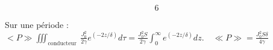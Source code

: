 \begin{quest}
{            $$
            6
            $$
            
            
            Sur une période : $<P \gg \iiint_{\text {conducteur }} \frac{J_0^2}{2 \gamma} e^{(-2 z / \delta)} d \tau=\frac{J_0^2 S}{2 \gamma} \int_0^{\infty} e^{(-2 z / \delta)} d z . \quad \ll P \gg=\frac{J_0^2 S \delta}{4 \gamma}$
        }
        
        \end{quest}
            
\FIN

            